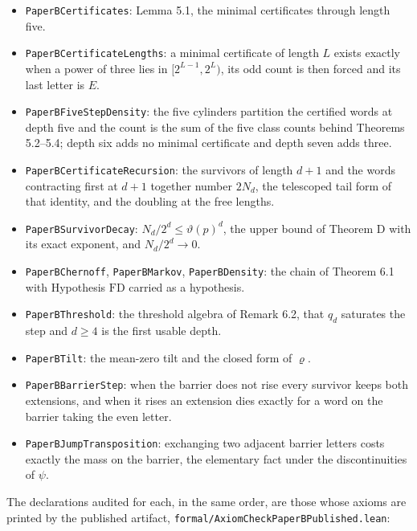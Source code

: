 \documentclass[11pt,a4paper]{article}
\providecommand{\tightlist}{\setlength{\itemsep}{0pt}\setlength{\parskip}{0pt}}
\begin{document}
\begin{itemize}
\tightlist
\item
  \texttt{PaperBCertificates}: Lemma 5.1, the minimal certificates
  through length five.
\item
  \texttt{PaperBCertificateLengths}: a minimal certificate of length
  \(L\) exists exactly when a power of three lies in
  \([2^{L-1},2^{L})\), its odd count is then forced and its last letter
  is \(E\).
\item
  \texttt{PaperBFiveStepDensity}: the five cylinders partition the
  certified words at depth five and the count is the sum of the five
  class counts behind Theorems 5.2--5.4; depth six adds no minimal
  certificate and depth seven adds three.
\item
  \texttt{PaperBCertificateRecursion}: the survivors of length \(d+1\)
  and the words contracting first at \(d+1\) together number \(2N_d\),
  the telescoped tail form of that identity, and the doubling at the
  free lengths.
\item
  \texttt{PaperBSurvivorDecay}: \(N_d/2^d\le\vartheta(p)^d\), the upper
  bound of Theorem D with its exact exponent, and \(N_d/2^d\to0\).
\item
  \texttt{PaperBChernoff}, \texttt{PaperBMarkov},
  \texttt{PaperBDensity}: the chain of Theorem 6.1 with Hypothesis
  \(\mathrm{FD}\) carried as a hypothesis.
\item
  \texttt{PaperBThreshold}: the threshold algebra of Remark 6.2, that
  \(q_d\) saturates the step and \(d\ge4\) is the first usable depth.
\item
  \texttt{PaperBTilt}: the mean-zero tilt and the closed form of
  \(\varrho\).
\item
  \texttt{PaperBBarrierStep}: when the barrier does not rise every
  survivor keeps both extensions, and when it rises an extension dies
  exactly for a word on the barrier taking the even letter.
\item
  \texttt{PaperBJumpTransposition}: exchanging two adjacent barrier
  letters costs exactly the mass on the barrier, the elementary fact
  under the discontinuities of \(\psi\).
\end{itemize}

The declarations audited for each, in the same order, are those whose
axioms are printed by the published artifact,
\texttt{formal/AxiomCheckPaperBPublished.lean}:
\end{document}
